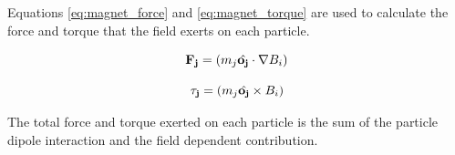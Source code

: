Equations \ref{eq:magnet_force} and \ref{eq:magnet_torque} are used to calculate the force and torque that the 
field exerts on each particle.

\begin{equation}
    \mathbf{F_{j}} = (m_j \Hat{\mathbf{o_j}} \cdot \nabla B_i)
    \label{eq:magnet_force}
\end{equation}

\begin{equation}
    \mathbf{\tau_j} = (m_j \Hat{\mathbf{o_j}} \times B_i)
    \label{eq:magnet_torque}
\end{equation}

The total force and torque exerted on each particle is the sum of the particle dipole interaction and the field 
dependent contribution. 
